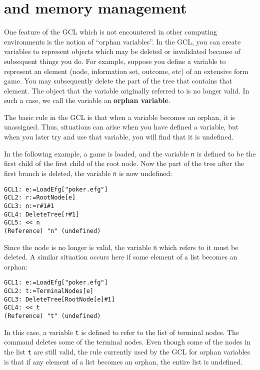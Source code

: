 \section{ and memory management}

One feature of the GCL which is not encountered in other computing
environments is the notion of ``orphan variables''.  In the GCL, you
can create variables to represent objects which may be deleted or
invalidated because of subsequent things you do. For example, suppose
you define a variable to represent an element (node, information set,
outcome, etc) of an extensive form game.  You may subsequently delete
the part of the tree that contains that element.  The object that the
variable originally referred to is no longer valid.  In such a case,
we call the variable an {\bf orphan variable}.

The basic rule in the GCL is that when a variable becomes an orphan,
it is unassigned.  Thus, situations can arise when you have defined a
variable, but when you later try and use that variable, you will find
that it is undefined.  

In the following example, a game is loaded, and the variable \verb+n+
is defined to be the first child of the first child of the root node.
Now the part of the tree after the first branch is deleted, the
variable \verb+n+ is now undefined:

\begin{verbatim}
GCL1: e:=LoadEfg["poker.efg"]
GCL2: r:=RootNode[e]
GCL3: n:=r#1#1
GCL4: DeleteTree[r#1]
GCL5: << n
(Reference) "n" (undefined)
\end{verbatim}

\noindent
Since the node is no longer is valid, the variable \verb+n+ which
refers to it must be deleted.  A similar situation occurs here if some
element of a list becomes an orphan:

\begin{verbatim}
GCL1: e:=LoadEfg["poker.efg"]
GCL2: t:=TerminalNodes[e]
GCL3: DeleteTree[RootNode[e]#1]
GCL4: << t
(Reference) "t" (undefined)
\end{verbatim}

In this case, a variable \verb+t+ is defined to refer to the list of
terminal nodes.  The  command deletes some of the
terminal nodes.  Even though some of the nodes in the list \verb+t+
are still valid, the rule currently used by the GCL for orphan
variables is that if any element of a list becomes an orphan, the
entire list is undefined.  

